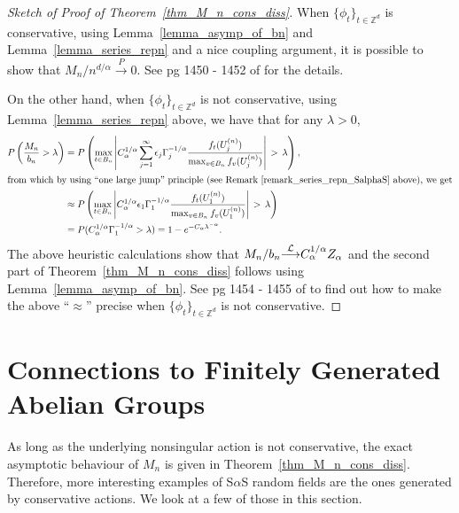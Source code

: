 \documentclass[12pt]{amsart}
\begin{document}
\begin{proof}[Sketch of Proof of Theorem~\ref{thm_M_n_cons_diss}] When ${\{\phi_t\}_{t \in \mathbb{Z}^d}}$ is conservative, using Lemma~\ref{lemma_asymp_of_bn} and Lemma~\ref{lemma_series_repn} and a nice coupling argument, it is possible to show that $M_n/n^{d/\alpha} {\stackrel{P}{\longrightarrow}} 0$. See pg 1450 - 1452 of \cite{samorodnitsky:2004a} for the details.

On the other hand, when ${\{\phi_t\}_{t \in \mathbb{Z}^d}}$ is not conservative, using Lemma~\ref{lemma_series_repn} above, we have that for any $\lambda>0$,
\begin{align*}
P\left(\frac{M_n}{b_n} > \lambda\right) &= P\left(\max_{t \in B_n} \left|C_\alpha^{1/\alpha} \sum_{j=1}^\infty \epsilon_j \Gamma_j^{-1/\alpha} \frac{f_t(U^{(n)}_j)}{\max_{ v \in B_n} f_v(U^{(n)}_j)}\right|\, > \, \lambda\right),\\
\intertext{from which by using ``one large jump'' principle (see Remark~\ref{remark_series_repn_SalphaS} above), we get}
                                                                    &\approx P\left(\max_{t \in B_n} \left|C_\alpha^{1/\alpha}\epsilon_1 \Gamma_1^{-1/\alpha} \frac{f_t(U^{(n)}_1)}{\max_{ v \in B_n} f_v(U^{(n)}_1)}\right|\, > \, \lambda\right)\\
                                                                    &=P(C_\alpha^{1/\alpha} \Gamma_1^{-1/\alpha} > \lambda) = 1 - e^{-C_\alpha \lambda^{-\alpha}}.
\end{align*}
The above heuristic calculations show that $M_n/b_n {\stackrel{\footnotesize{\mathcal{L}}}{\longrightarrow}} C_\alpha^{1/\alpha} Z_\alpha$ and the second part of Theorem~\ref{thm_M_n_cons_diss} follows using Lemma~\ref{lemma_asymp_of_bn}. See pg 1454 - 1455 of \cite{samorodnitsky:2004a} to find out how to make the above ``$\approx$'' precise when ${\{\phi_t\}_{t \in \mathbb{Z}^d}}$ is not conservative.
\end{proof}

\normalsize

\section{Connections to Finitely Generated Abelian Groups} \label{sec:fg_ab_gp}

As long as the underlying nonsingular action is not conservative, the exact asymptotic behaviour of $M_n$ is given in Theorem~\ref{thm_M_n_cons_diss}. Therefore, more interesting examples of S$\alpha$S random fields are the ones generated by conservative actions. We look at a few of those in this section.
\end{document}
